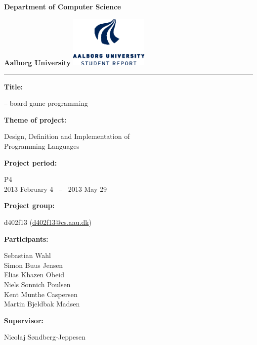 \begin{nopagebreak}
  \begin{minipage}{\textwidth}
    \vspace{2cm}
    \LARGE{\textbf{Department of Computer Science}}\vspace{-2.1cm}

    \large{\textbf{Aalborg University}}
    \hspace{8.30cm}\includegraphics[height=2.5cm]{pictures/aau_logo_en_blue.eps}
  \end{minipage}
  \vspace{0.1cm}
  \hrule

  \newcommand{\titleitem}[2]{\textbf{#1:}

  \hspace*{0.5cm}
  \begin{minipage}{0.9\columnwidth}#2\end{minipage}
  \vspace{0.25cm}}
  \begin{multicols}{2}

    \titleitem{Title}{\productname{} -- board game programming}

    \titleitem{Theme of project}{Design, Definition and Implementation of \\Programming Languages}

    \titleitem{Project period}{P4\\2013 February 4 ~--~ 2013 May 29}

    \titleitem{Project group}{d402f13 (\url{d402f13@cs.aau.dk})}

    \titleitem{Participants}{
      Sebastian Wahl\\
      Simon Buus Jensen\\
      Elias Khazen Obeid\\
      Niels Sonnich Poulsen\\
      Kent Munthe Caspersen\\
      Martin Bjeldbak Madsen
    }

    \titleitem{Supervisor}{Nicolaj Søndberg-Jeppesen}


\end{multicols}
\end{nopagebreak}

